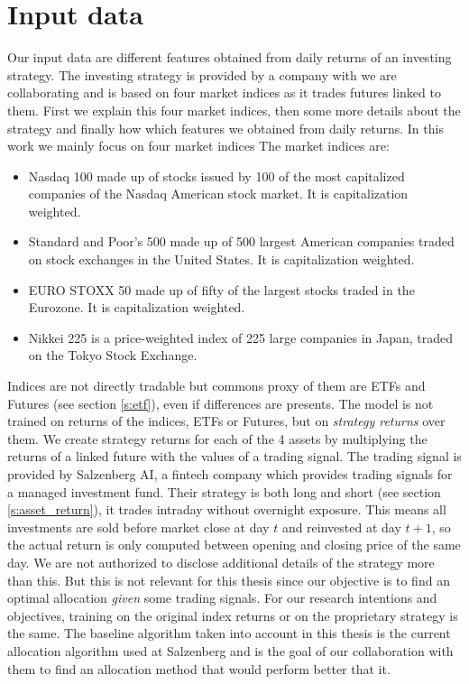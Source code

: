 \section{Input data}
\label{s:input_data}
Our input data are different features obtained from daily returns of an investing strategy. The investing strategy is provided by a company with we are collaborating and is based on four market indices as it trades futures linked to them. First we explain this four market indices, then some more details about the strategy and finally how which features we obtained from daily returns.
In this work we mainly focus on four market indices The market indices are: 
\begin{itemize}
    \item Nasdaq 100 made up of stocks issued by 100 of the most capitalized companies of the Nasdaq American stock market. It is capitalization weighted.  
    \item Standard and Poor's 500 made up of 500 largest American companies traded on stock exchanges in the United States. It is capitalization weighted.  
    \item EURO STOXX 50 made up of fifty of the largest stocks traded in the Eurozone. It is capitalization weighted.  
    \item Nikkei 225 is a price-weighted index of 225 large companies in Japan, traded on the Tokyo Stock Exchange.
\end{itemize}
Indices are not directly tradable but commons proxy of them are ETFs and Futures (see section \ref{s:etf}), even if differences are presents. 
The model is not trained on returns of the indices, ETFs or Futures, but on \textit{strategy returns} over them. We create strategy returns for each of the 4 assets by multiplying the returns of a linked future with the values of a trading signal. The trading signal is provided by Salzenberg AI, a fintech company which provides trading signals for a managed investment fund. 
Their strategy is both long and short (see section \ref{s:asset_return}), it trades intraday without overnight exposure. This means all investments are sold before market close at day $t$ and reinvested at day $t+1$, so the actual return is only computed between opening and closing price of the same day. 
We are not authorized to disclose additional details of the strategy more than this. But this is not relevant for this thesis since our objective is to find an optimal allocation {\it given} some trading signals. For our research intentions and objectives, training on the original index returns or on the proprietary strategy is the same. The baseline algorithm taken into account in this thesis is the current allocation algorithm used at Salzenberg and is the goal of our collaboration with them to find an allocation method that would perform better that it.




